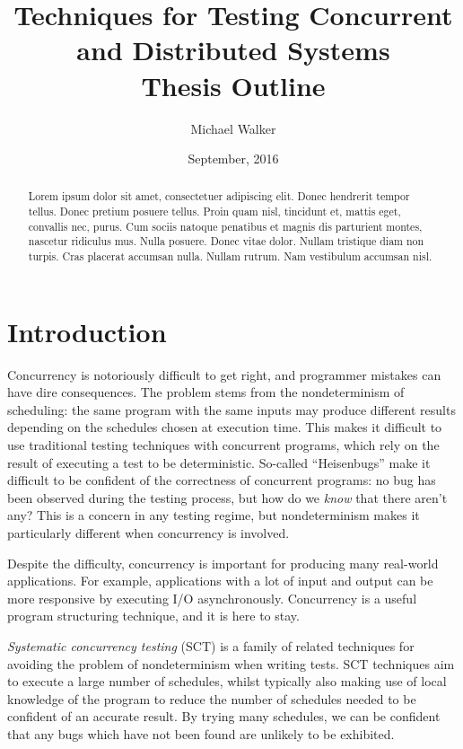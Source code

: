 \documentclass{article}
\title{Techniques for Testing Concurrent and Distributed Systems \\ \large Thesis Outline}
\author{Michael Walker}
\date{September, 2016}
\begin{document}
\maketitle

\begin{abstract}
  Lorem ipsum dolor sit amet, consectetuer adipiscing elit. Donec
  hendrerit tempor tellus. Donec pretium posuere tellus. Proin quam
  nisl, tincidunt et, mattis eget, convallis nec, purus. Cum sociis
  natoque penatibus et magnis dis parturient montes, nascetur
  ridiculus mus. Nulla posuere. Donec vitae dolor. Nullam tristique
  diam non turpis. Cras placerat accumsan nulla. Nullam rutrum. Nam
  vestibulum accumsan nisl.
\end{abstract}

\tableofcontents

\pagebreak

\section{Introduction}

Concurrency is notoriously difficult to get right\cite{yang2013}, and
programmer mistakes can have dire consequences\cite{leveson1993}. The
problem stems from the nondeterminism of scheduling: the same program
with the same inputs may produce different results depending on the
schedules chosen at execution time. This makes it difficult to use
traditional testing techniques with concurrent programs, which rely on
the result of executing a test to be deterministic. So-called
``Heisenbugs'' make it difficult to be confident of the correctness of
concurrent programs: no bug has been observed during the testing
process, but how do we \emph{know} that there aren't any? This is a
concern in any testing regime, but nondeterminism makes it
particularly different when concurrency is involved.

Despite the difficulty, concurrency is important for producing many
real-world applications. For example, applications with a lot of input
and output can be more responsive by executing I/O asynchronously.
Concurrency is a useful program structuring technique, and it is here
to stay.

\emph{Systematic concurrency testing}
(SCT)\cite{emmi2011,musuvathi2007,musuvathi2008,thomson2014} is a
family of related techniques for avoiding the problem of
nondeterminism when writing tests. SCT techniques aim to execute a
large number of schedules, whilst typically also making use of local
knowledge of the program to reduce the number of schedules needed to
be confident of an accurate result. By trying many schedules, we can
be confident that any bugs which have not been found are unlikely to
be exhibited.
\end{document}
